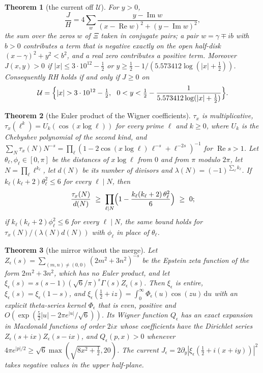 \documentclass[11pt]{article}
\newtheorem{theorem}{Theorem}[section]
\theoremstyle{definition}\newtheorem{definition}[theorem]{Definition}
\theoremstyle{remark}\newtheorem{remark}[theorem]{Remark}
\newcommand{\dd}{\,\mathrm d}\newcommand{\e}{\mathrm e}
\renewcommand{\Re}{\operatorname{Re}}\renewcommand{\Im}{\operatorname{Im}}
\begin{document}
\begin{theorem}[the current off $\mathcal U$]\label{mt:region}
For $y>0$,
\[
\frac JH=4\sum_w\frac{y-\Im w}{(x-\Re w)^2+(y-\Im w)^2},
\]
the sum over the zeros $w$ of $\Xi$ taken in conjugate pairs; a pair $w=\gamma\mp ib$ with $b>0$ contributes a term that is negative exactly on the open half-disk $(x-\gamma)^2+y^2<b^2$, and a real zero contributes a positive term. Moreover $J(x,y)>0$ if $|x|\le3\cdot10^{12}-\frac12$ or $y\ge\frac12-1/(5.573412\log(|x|+\frac12))$. Consequently RH holds if and only if $J\ge0$ on
\[
\mathcal U=\Bigl\{|x|>3\cdot10^{12}-\tfrac12,\ \ 0<y<\tfrac12-\frac1{5.573412\log(|x|+\frac12)}\Bigr\}.
\]
\end{theorem}

\begin{theorem}[the Euler product of the Wigner coefficients]\label{mt:euler}
$\tau_x$ is multiplicative, $\tau_x(\ell^k)=U_k(\cos(x\log\ell))$ for every prime $\ell$ and $k\ge0$, where $U_k$ is the Chebyshev polynomial of the second kind, and $\sum_N\tau_x(N)N^{-s}=\prod_\ell(1-2\cos(x\log\ell)\,\ell^{-s}+\ell^{-2s})^{-1}$ for $\Re s>1$. Let $\theta_\ell,\phi_\ell\in[0,\pi]$ be the distances of $x\log\ell$ from $0$ and from $\pi$ modulo $2\pi$, let $N=\prod_\ell\ell^{k_\ell}$, let $d(N)$ be its number of divisors and $\lambda(N)=(-1)^{\sum_\ell k_\ell}$. If $k_\ell(k_\ell+2)\theta_\ell^2\le6$ for every $\ell\mid N$, then
\[
\frac{\tau_x(N)}{d(N)}\ \ge\ \prod_{\ell\mid N}\Bigl(1-\frac{k_\ell(k_\ell+2)\,\theta_\ell^2}6\Bigr)\ \ge\ 0 ;
\]
if $k_\ell(k_\ell+2)\phi_\ell^2\le6$ for every $\ell\mid N$, the same bound holds for $\tau_x(N)/(\lambda(N)d(N))$ with $\phi_\ell$ in place of $\theta_\ell$.
\end{theorem}

\begin{theorem}[the mirror without the merge]\label{mt:epstein}
Let $Z_\epsilon(s)=\sum_{(m,n)\ne(0,0)}(2m^2+3n^2)^{-s}$ be the Epstein zeta function of the form $2m^2+3n^2$, which has no Euler product, and let $\xi_\epsilon(s)=s(s-1)(\sqrt6/\pi)^s\Gamma(s)Z_\epsilon(s)$. Then $\xi_\epsilon$ is entire, $\xi_\epsilon(s)=\xi_\epsilon(1-s)$, and $\xi_\epsilon(\frac12+iz)=\int_0^\infty\Phi_\epsilon(u)\cos(zu)\dd u$ with an explicit theta-series kernel $\Phi_\epsilon$ that is even, positive and $O(\exp(\frac52|u|-2\pi e^{|u|}/\sqrt6))$. Its Wigner function $Q_\epsilon$ has an exact expansion in Macdonald functions of order $2ix$ whose coefficients have the Dirichlet series $Z_\epsilon(s+ix)Z_\epsilon(s-ix)$, and $Q_\epsilon(p,x)>0$ whenever $4\pi e^{|p|/2}\ge\sqrt6\max(\sqrt{8x^2+\frac12},20)$. The current $J_\epsilon=2\partial_y|\xi_\epsilon(\frac12+i(x+iy))|^2$ takes negative values in the upper half-plane.
\end{theorem}
\end{document}
